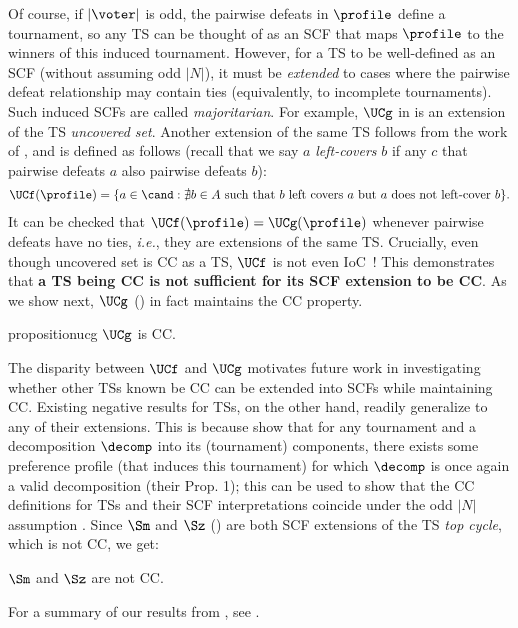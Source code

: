 Of course, if $|\voter|$ is odd, the pairwise defeats in $\profile$ define a tournament, so any TS can be thought of as an SCF that maps $\profile$ to the winners of this induced tournament. However, for a TS to be well-defined as an SCF (without assuming odd $|N|$), it must be \emph{extended} to cases where the pairwise defeat relationship may contain ties (equivalently, to incomplete tournaments). Such induced SCFs are called \emph{majoritarian}. For example, $\UCg$ in  is an extension of the TS \emph{uncovered set}. Another extension of the same TS follows from the work of \citet{Fishburn77:Condorcet}, and is defined as follows (recall that we say $a$ \emph{left-covers} $b$ if any $c$ that pairwise defeats $a$ also pairwise defeats $b$):
\begin{align*}
    \UCf(\profile)=\{a\in \cand: \nexists b \in A\text{ such that }b\text{ left covers }a\text{ but }a\text{ does not left-cover }b\}.
\end{align*}
It can be checked that $\UCf(\profile)=\UCg(\profile)$ whenever pairwise defeats have no ties, \emph{i.e.}, they are extensions of the same TS. Crucially, even though uncovered set is CC as a TS, $\UCf$ is not even IoC~\citep{Holliday23:Split}! This demonstrates that \textbf{a TS being CC is not sufficient for its SCF extension to be CC}. As we show next, $\UCg$ () in fact maintains the CC property.
\begin{restatable}{proposition}{ucg}\label{prop:ucg}
    $\UCg$ is CC.
\end{restatable}

The disparity between $\UCf$ and $\UCg$ motivates future work in investigating whether other TSs known be CC can be extended into SCFs while maintaining CC. Existing negative results for TSs, on the other hand, readily generalize to any of their extensions. This is because \citet{Laffond96:Composition} show that for any tournament and a decomposition $\decomp$ into its (tournament) components, there exists some preference profile (that induces this tournament) for which $\decomp$ is once again a valid decomposition (their Prop. 1); this can be used to show that the CC definitions for TSs and their SCF interpretations coincide under the odd $|N|$ assumption \cite[Prop. 2]{Laffond96:Composition}. Since $\Sm$ and $\Sz$ () are both SCF extensions of the TS \emph{top cycle}, which is not CC, we get:
\begin{proposition} $\Sm$ and $\Sz$ are not CC.
    
\end{proposition}
\noindent For a summary of our results from , see .
